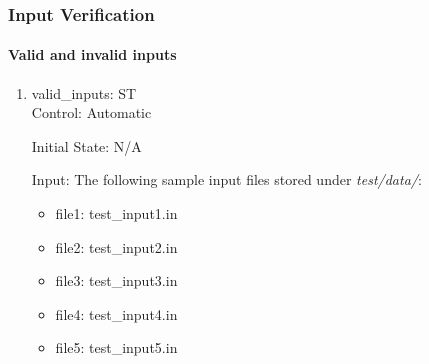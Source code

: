 \documentclass[12pt, titlepage]{article}
\newcounter{systnum} %
\begin{document}
\subsubsection{Input Verification}
\label{section:inputs}


\paragraph{Valid and invalid inputs}

\begin{enumerate}

\item{valid\_inputs: ST\thesystnum \label{ST1}\\}
Control: Automatic
					
Initial State: N/A

Input: The following sample input files stored under \textit{test/data/}:
\begin{itemize}
	\item file1: test\_input1.in
	\item file2: test\_input2.in
	\item file3: test\_input3.in
	\item file4: test\_input4.in
	\item file5: test\_input5.in
\end{itemize}				


\end{enumerate}
\end{document}

